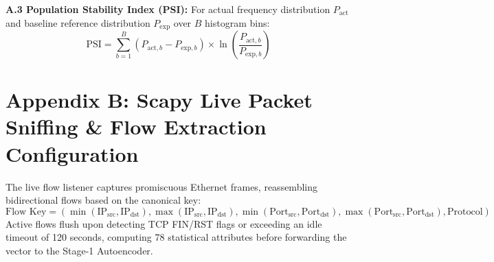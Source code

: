\documentclass[12pt,a4paper]{report}
\begin{document}
\textbf{A.3 Population Stability Index (PSI):}
For actual frequency distribution $P_{\text{act}}$ and baseline reference distribution $P_{\text{exp}}$ over $B$ histogram bins:
\begin{equation}
\text{PSI} = \sum_{b=1}^B \left(P_{\text{act}, b} - P_{\text{exp}, b}\right) \times \ln\left(\frac{P_{\text{act}, b}}{P_{\text{exp}, b}}\right)
\label{eq:app_psi}
\end{equation}

\section*{Appendix B: Scapy Live Packet Sniffing \& Flow Extraction Configuration}
The live flow listener captures promiscuous Ethernet frames, reassembling bidirectional flows based on the canonical key:
\begin{equation}
\text{Flow Key} = \left(\min(\text{IP}_{\text{src}}, \text{IP}_{\text{dst}}), \max(\text{IP}_{\text{src}}, \text{IP}_{\text{dst}}), \min(\text{Port}_{\text{src}}, \text{Port}_{\text{dst}}), \max(\text{Port}_{\text{src}}, \text{Port}_{\text{dst}}), \text{Protocol}\right)
\label{eq:app_flowkey}
\end{equation}
Active flows flush upon detecting TCP FIN/RST flags or exceeding an idle timeout of 120 seconds, computing 78 statistical attributes before forwarding the vector to the Stage-1 Autoencoder.
\end{document}
